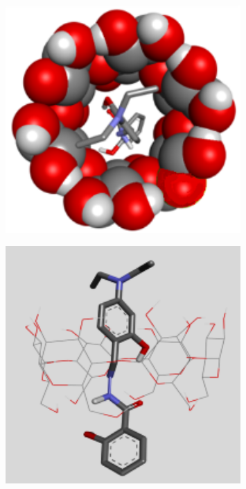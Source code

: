 \begin{figure}[H]
	\centering
	\includegraphics[width=0.8\textwidth]{media/chem2/image37}
	\caption*{}
\end{figure}

\begin{figure}[H]
	\centering
	\includegraphics[width=0.8\textwidth]{media/chem2/image38}
	\caption*{}
\end{figure}

